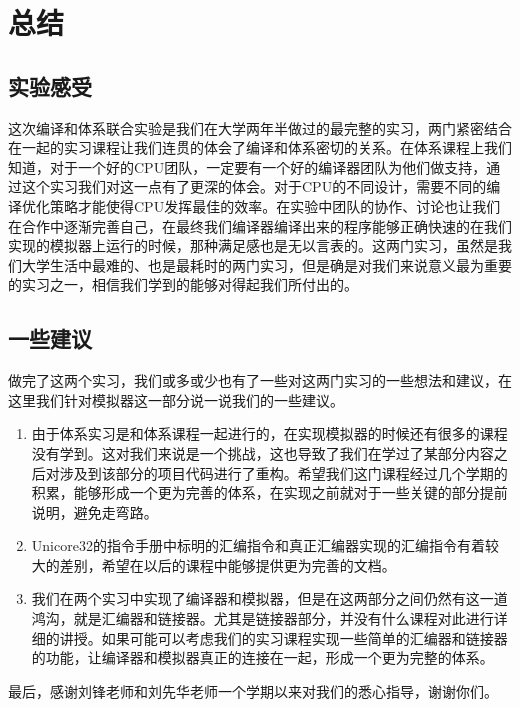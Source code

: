 \documentclass[12pt,a4paper]{article}
\begin{document}
\section{总结}
\subsection{实验感受}
这次编译和体系联合实验是我们在大学两年半做过的最完整的实习，两门紧密结合在一起的实习课程让我们连贯的体会了编译和体系密切的关系。在体系课程上我们知道，对于一个好的CPU团队，一定要有一个好的编译器团队为他们做支持，通过这个实习我们对这一点有了更深的体会。对于CPU的不同设计，需要不同的编译优化策略才能使得CPU发挥最佳的效率。在实验中团队的协作、讨论也让我们在合作中逐渐完善自己，在最终我们编译器编译出来的程序能够正确快速的在我们实现的模拟器上运行的时候，那种满足感也是无以言表的。这两门实习，虽然是我们大学生活中最难的、也是最耗时的两门实习，但是确是对我们来说意义最为重要的实习之一，相信我们学到的能够对得起我们所付出的。

\subsection{一些建议}
做完了这两个实习，我们或多或少也有了一些对这两门实习的一些想法和建议，在这里我们针对模拟器这一部分说一说我们的一些建议。
\begin{enumerate}
	\item 由于体系实习是和体系课程一起进行的，在实现模拟器的时候还有很多的课程没有学到。这对我们来说是一个挑战，这也导致了我们在学过了某部分内容之后对涉及到该部分的项目代码进行了重构。希望我们这门课程经过几个学期的积累，能够形成一个更为完善的体系，在实现之前就对于一些关键的部分提前说明，避免走弯路。
	\item Unicore32的指令手册中标明的汇编指令和真正汇编器实现的汇编指令有着较大的差别，希望在以后的课程中能够提供更为完善的文档。
	\item 我们在两个实习中实现了编译器和模拟器，但是在这两部分之间仍然有这一道鸿沟，就是汇编器和链接器。尤其是链接器部分，并没有什么课程对此进行详细的讲授。如果可能可以考虑我们的实习课程实现一些简单的汇编器和链接器的功能，让编译器和模拟器真正的连接在一起，形成一个更为完整的体系。
\end{enumerate}
最后，感谢刘锋老师和刘先华老师一个学期以来对我们的悉心指导，谢谢你们。
\end{document}
